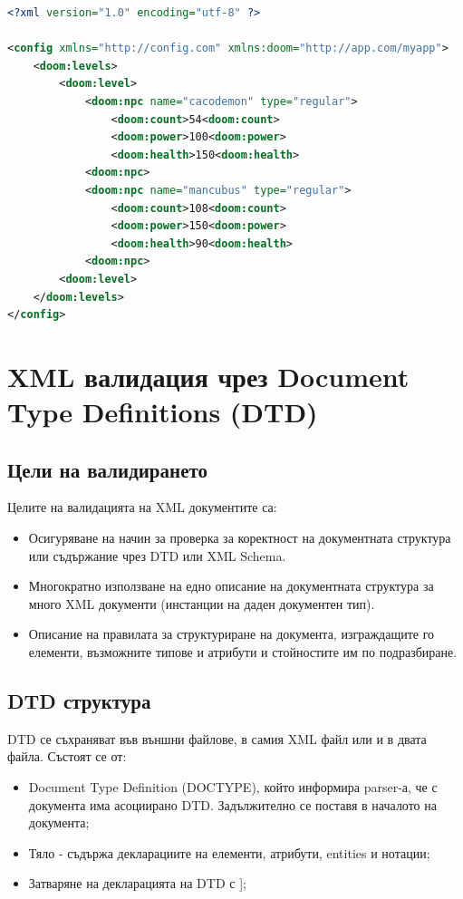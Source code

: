 \documentclass[fleqn,12pt]{article}
\begin{document}
\begin{lstlisting}[language=XML, caption=Doom namespace]
<?xml version="1.0" encoding="utf-8" ?>

<config xmlns="http://config.com" xmlns:doom="http://app.com/myapp">
    <doom:levels>
        <doom:level>
            <doom:npc name="cacodemon" type="regular">
                <doom:count>54<doom:count>
                <doom:power>100<doom:power>
                <doom:health>150<doom:health>
            <doom:npc>
            <doom:npc name="mancubus" type="regular">
                <doom:count>108<doom:count>
                <doom:power>150<doom:power>
                <doom:health>90<doom:health>
            <doom:npc>
        <doom:level>
    </doom:levels>
</config>
\end{lstlisting}


\section{XML валидация чрез Document Type Definitions (DTD)}

\subsection{Цели на валидирането}

Целите на валидацията на XML документите са:
\begin{itemize}
    \item Осигуряване на начин за проверка за коректност на документната структура или съдържание чрез DTD или XML Schema.
    \item Многократно използване на едно описание на документната структура за много XML документи (инстанции на даден документен тип).
    \item Описание на правилата за структуриране на документа, изграждащите го елементи, възможните типове и атрибути и стойностите им по подразбиране.
\end{itemize}


\subsection{DTD структура}

DTD се съхраняват във външни файлове, в самия XML файл или и в двата файла. Състоят се от:
\begin{itemize}
    \item Document Type Definition (DOCTYPE), който информира parser-а, че с документа има асоциирано DTD. Задължително се поставя в началото на документа;
    \item Тяло - съдържа декларациите на елементи, атрибути, entities и нотации;
    \item Затваряне на декларацията на DTD с ];
\end{itemize}
\end{document}
